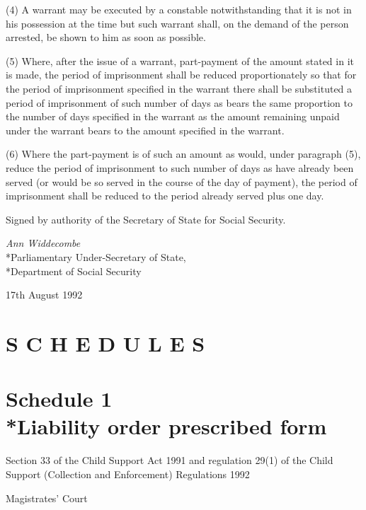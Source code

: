 \documentclass[a4paper]{article}
\newcommand{\parthead}{}
\begin{document}
(4) A warrant may be executed by a constable notwithstanding that it is not in his possession at the time but such warrant shall, on the demand of the person arrested, be shown to him as soon as possible.

(5) Where, after the issue of a warrant, part-payment of the amount stated in it is made, the period of imprisonment shall be reduced proportionately so that for the period of imprisonment specified in the warrant there shall be substituted a period of imprisonment of such number of days as bears the same proportion to the number of days specified in the warrant as the amount remaining unpaid under the warrant bears to the amount specified in the warrant.

(6) Where the part-payment is of such an amount as would, under paragraph (5), reduce the period of imprisonment to such number of days as have already been served (or would be so served in the course of the day of payment), the period of imprisonment shall be reduced to the period already served plus one day.

\bigskip

Signed by authority of the Secretary of State for Social Security.

{\raggedleft
\emph{Ann Widdecombe}\\*Parliamentary Under-Secretary of State,\\*Department of Social Security

}

17th August 1992

\clearpage

\part*{S C H E D U L E S}

\part[Schedule 1 --- Liability order prescribed form]{Schedule 1\\*Liability order prescribed form}

\renewcommand\parthead{--- Schedule 1}

\noindent
Section 33 of the Child Support Act 1991 and regulation 29(1) of the Child Support (Collection and Enforcement) Regulations 1992

\medskip

{\raggedleft \hspace{0.5\linewidth}\dotfill Magistrates' Court

}
\end{document}
